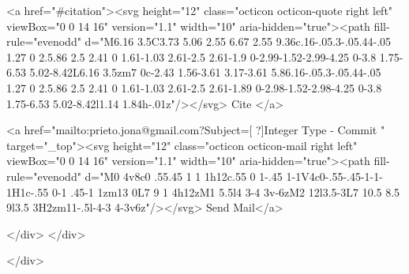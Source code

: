       <a  href="#citation"><svg height="12" class="octicon octicon-quote right left" viewBox="0 0 14 16" version="1.1" width="10" aria-hidden="true"><path fill-rule="evenodd" d="M6.16 3.5C3.73 5.06 2.55 6.67 2.55 9.36c.16-.05.3-.05.44-.05 1.27 0 2.5.86 2.5 2.41 0 1.61-1.03 2.61-2.5 2.61-1.9 0-2.99-1.52-2.99-4.25 0-3.8 1.75-6.53 5.02-8.42L6.16 3.5zm7 0c-2.43 1.56-3.61 3.17-3.61 5.86.16-.05.3-.05.44-.05 1.27 0 2.5.86 2.5 2.41 0 1.61-1.03 2.61-2.5 2.61-1.89 0-2.98-1.52-2.98-4.25 0-3.8 1.75-6.53 5.02-8.42l1.14 1.84h-.01z"/></svg> Cite
      </a>

      <a href="mailto:prieto.jona@gmail.com?Subject=[ ?]Integer Type - Commit " target="_top"><svg height="12" class="octicon octicon-mail right left" viewBox="0 0 14 16" version="1.1" width="10" aria-hidden="true"><path fill-rule="evenodd" d="M0 4v8c0 .55.45 1 1 1h12c.55 0 1-.45 1-1V4c0-.55-.45-1-1-1H1c-.55 0-1 .45-1 1zm13 0L7 9 1 4h12zM1 5.5l4 3-4 3v-6zM2 12l3.5-3L7 10.5 8.5 9l3.5 3H2zm11-.5l-4-3 4-3v6z"/></svg> Send Mail</a>

    </div>
  </div>

</div>




